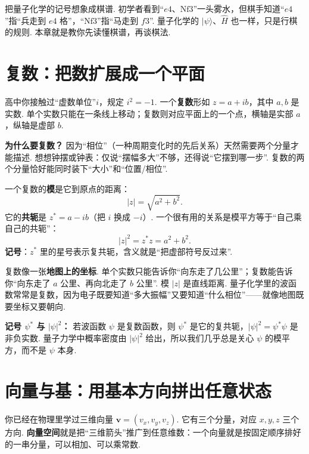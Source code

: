 \documentclass[UTF8,11pt,a4paper,openany]{ctexbook}
\newcommand{\ket}[1]{\lvert #1\rangle}\newcommand{\bra}[1]{\langle #1\rvert}
\newcommand{\term}[1]{\textbf{#1}}
\begin{document}
\begin{analogybox}
把量子化学的记号想象成棋谱. 初学者看到“$e4$、$\mathrm{Nf3}$”一头雾水，但棋手知道“$e4$”指“兵走到 $e4$ 格”，“$\mathrm{Nf3}$”指“马走到 $f3$”. 量子化学的 $\ket\psi$、$\hat H$ 也一样，只是行棋的规则. 本章就是教你先读懂棋谱，再谈棋法. 
\end{analogybox}

\section{复数：把数扩展成一个平面}
\label{sec:complex}
高中你接触过“虚数单位”$i$，规定 $i^2=-1$. 一个\term{复数}形如 $z=a+ib$，其中 $a,b$ 是实数. 单个实数只能在一条线上移动；复数则对应平面上的一个点，横轴是实部 $a$，纵轴是虚部 $b$. 

\textbf{为什么要复数？} 因为“相位”（一种周期变化时的先后关系）天然需要两个分量才能描述. 想想钟摆或钟表：仅说“摆幅多大”不够，还得说“它摆到哪一步”. 复数的两个分量恰好能同时装下“大小”和“位置/相位”. 

一个复数的\term{模}是它到原点的距离：
\[
|z|=\sqrt{a^2+b^2}.
\]
它的\term{共轭}是 $z^*=a-ib$（把 $i$ 换成 $-i$）. 一个很有用的关系是模平方等于“自己乘自己的共轭”：
\[
|z|^2=z^*z=a^2+b^2.
\]
\textbf{记号}：$z^*$ 里的星号表示复共轭，含义就是“把虚部符号反过来”. 

\begin{analogybox}
复数像一张\textbf{地图上的坐标}. 单个实数只能告诉你“向东走了几公里”；复数能告诉你“向东走了 $a$ 公里、再向北走了 $b$ 公里”. 模 $|z|$ 是直线距离. 量子化学里的波函数常常是复数，因为电子既要知道“多大振幅”又要知道“什么相位”——就像地图既要坐标又要朝向. 
\end{analogybox}

\begin{notationbox}
\textbf{记号 $\psi^*$ 与 $|\psi|^2$：} 若波函数 $\psi$ 是复数函数，则 $\psi^*$ 是它的复共轭，$|\psi|^2=\psi^*\psi$ 是非负实数. 量子力学中概率密度由 $|\psi|^2$ 给出，所以我们几乎总是关心 $\psi$ 的模平方，而不是 $\psi$ 本身. 
\end{notationbox}

\section{向量与基：用基本方向拼出任意状态}
\label{sec:vectors}
你已经在物理里学过三维向量 $\mathbf v=(v_x,v_y,v_z)$. 它有三个分量，对应 $x,y,z$ 三个方向. \term{向量空间}就是把“三维箭头”推广到任意维数：一个向量就是按固定顺序排好的一串分量，可以相加、可以乘常数. 
\end{document}
